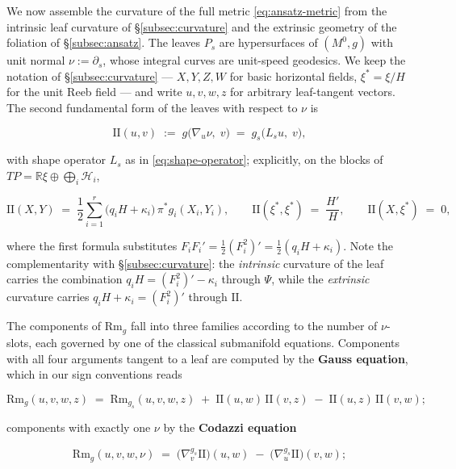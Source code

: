 \documentclass[11pt]{amsart}
\theoremstyle{plain}
\numberwithin{equation}{section}
\theoremstyle{definition}
\theoremstyle{remark}
\begin{document}
We now assemble the curvature of the full metric \eqref{eq:ansatz-metric} from the intrinsic leaf curvature of \S\ref{subsec:curvature} and the extrinsic geometry of the foliation of \S\ref{subsec:ansatz}. The leaves $P_s$ are hypersurfaces of $(M^0, g)$ with unit normal $\nu := \partial_s$, whose integral curves are unit-speed geodesics. We keep the notation of \S\ref{subsec:curvature} --- $X, Y, Z, W$ for basic horizontal fields, $\xi^* = \xi/H$ for the unit Reeb field --- and write $u, v, w, z$ for arbitrary leaf-tangent vectors. The second fundamental form of the leaves with respect to $\nu$ is

\[
\mathrm{II}(u, v) \;:=\; g\big( \nabla_u \nu, \; v \big) \;=\; g_s\big( L_s u, \; v \big),
\]

with shape operator $L_s$ as in \eqref{eq:shape-operator}; explicitly, on the blocks of $TP = \mathbb{R}\xi \oplus \bigoplus_i \mathcal{H}_i$,

\begin{equation}\label{eq:second-fundamental-form}
	\mathrm{II}(X, Y) \;=\; \frac{1}{2} \sum_{i=1}^r \big( q_i H + \kappa_i \big)\, \pi^*g_i(X_i, Y_i), \qquad \mathrm{II}(\xi^*, \xi^*) \;=\; \frac{H'}{H}, \qquad \mathrm{II}(X, \xi^*) \;=\; 0 ,
\end{equation}

where the first formula substitutes $F_i F_i' = \tfrac{1}{2}(F_i^2)' = \tfrac{1}{2}(q_i H + \kappa_i)$. Note the complementarity with \S\ref{subsec:curvature}: the \emph{intrinsic} curvature of the leaf carries the combination $q_i H = (F_i^2)' - \kappa_i$ through $\Psi$, while the \emph{extrinsic} curvature carries $q_i H + \kappa_i = (F_i^2)'$ through $\mathrm{II}$.

The components of $\mathrm{Rm}_g$ fall into three families according to the number of $\nu$-slots, each governed by one of the classical submanifold equations. Components with all four arguments tangent to a leaf are computed by the \textbf{Gauss equation}, which in our sign conventions reads

\begin{equation}\label{eq:gauss-leaf}
	\mathrm{Rm}_g(u, v, w, z) \;=\; \mathrm{Rm}_{g_s}(u, v, w, z) \;+\; \mathrm{II}(u, w)\, \mathrm{II}(v, z) \;-\; \mathrm{II}(u, z)\, \mathrm{II}(v, w) ;
\end{equation}

components with exactly one $\nu$ by the \textbf{Codazzi equation}

\begin{equation}\label{eq:codazzi-leaf}
	\mathrm{Rm}_g(u, v, w, \nu) \;=\; \big( \nabla^{g_s}_v \mathrm{II} \big)(u, w) \;-\; \big( \nabla^{g_s}_u \mathrm{II} \big)(v, w) ;
\end{equation}
\end{document}
